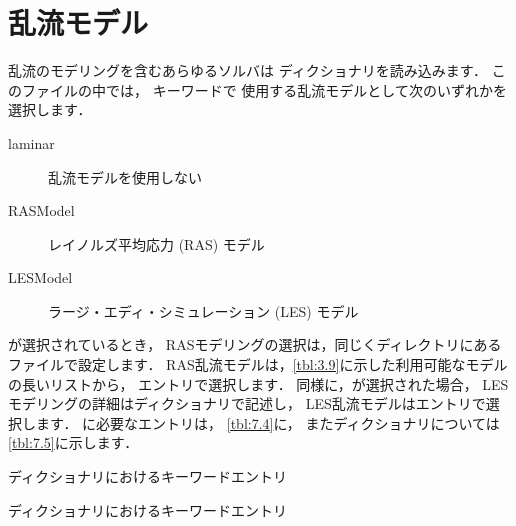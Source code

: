 \section{乱流モデル}
\label{sec:7.2}
乱流のモデリングを含むあらゆるソルバは
%
%
ディクショナリを読み込みます．
このファイルの中では，
%
%
キーワードで
使用する乱流モデルとして次のいずれかを選択します．
\begin{description}
 \item[laminar]
%
%
            乱流モデルを使用しない
 \item[RASModel]
%
%
            レイノルズ平均応力 (RAS) モデル
 \item[LESModel]
%
%
            ラージ・エディ・シミュレーション (LES) モデル
\end{description}

が選択されているとき，
RASモデリングの選択は，同じくディレクトリにある
ファイルで設定します．
RAS乱流モデルは，\autoref{tbl:3.9}に示した利用可能なモデルの長いリストから，
エントリで選択します．
同様に，が選択された場合，
LESモデリングの詳細はディクショナリで記述し，
LES乱流モデルはエントリで選択します．
に必要なエントリは，
\autoref{tbl:7.4}に，
またディクショナリについては
\autoref{tbl:7.5}に示します．


\begin{table}[ht]
 
 \caption{ディクショナリにおけるキーワードエントリ}
 \label{tbl:7.4}
\end{table}


\begin{table}[ht]
 
 \caption{ディクショナリにおけるキーワードエントリ}
 \label{tbl:7.5}
\end{table}


